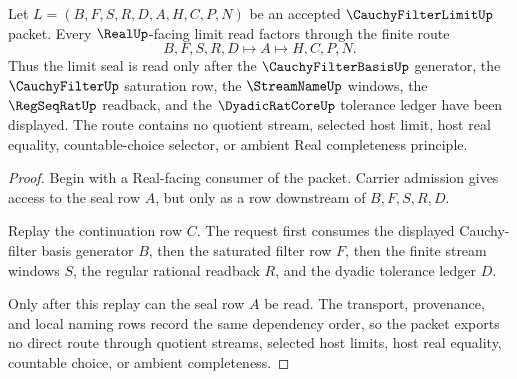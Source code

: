 \begin{theorem}
\label{thm:cauchy-filter-limit-regular-seal-handoff}
Let $L=(B,F,S,R,D,A,H,C,P,N)$ be an accepted $\CauchyFilterLimitUp$ packet. Every $\RealUp$-facing limit read factors through the finite route
$$
B,F,S,R,D \longmapsto A \longmapsto H,C,P,N .
$$
Thus the limit seal is read only after the $\CauchyFilterBasisUp$ generator, the $\CauchyFilterUp$ saturation row, the $\StreamNameUp$ windows, the $\RegSeqRatUp$ readback, and the $\DyadicRatCoreUp$ tolerance ledger have been displayed. The route contains no quotient stream, selected host limit, host real equality, countable-choice selector, or ambient Real completeness principle.
\end{theorem}
\begin{proof}
Begin with a Real-facing consumer of the packet. Carrier admission gives access to the seal row $A$, but only as a row downstream of $B,F,S,R,D$.

Replay the continuation row $C$. The request first consumes the displayed Cauchy-filter basis generator $B$, then the saturated filter row $F$, then the finite stream windows $S$, the regular rational readback $R$, and the dyadic tolerance ledger $D$.

Only after this replay can the seal row $A$ be read. The transport, provenance, and local naming rows record the same dependency order, so the packet exports no direct route through quotient streams, selected host limits, host real equality, countable choice, or ambient completeness.
\end{proof}

